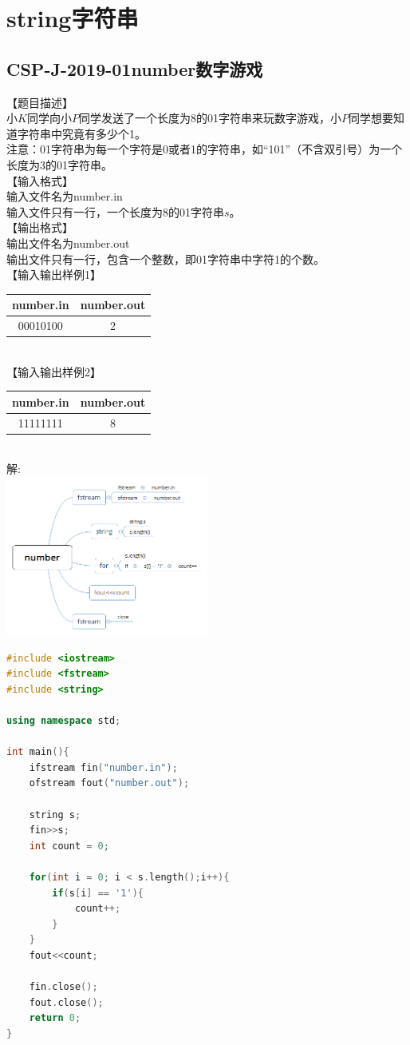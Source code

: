 \documentclass[12pt,twiside,a4paper]{ctexbook}
\numberwithin{chapter}{part}
\begin{document}
\chapter{string字符串}
\section{CSP-J-2019-01number数字游戏}
【题目描述】\\
小$K$同学向小$P$同学发送了一个长度为8的01字符串来玩数字游戏，小$P$同学想要知道字符串中究竟有多少个1。\\
注意：01字符串为每一个字符是0或者1的字符串，如“101”（不含双引号）为一个长度为3的01字符串。\\
【输入格式】\\
输入文件名为number.in\\
输入文件只有一行，一个长度为8的01字符串$s$。\\
【输出格式】\\
输出文件名为number.out\\
输出文件只有一行，包含一个整数，即01字符串中字符1的个数。\\
【输入输出样例1】\\
\begin{tabular}{|c|c|}
\hline
number.in & number.out\\
\hline
00010100 & 2\\
\hline
\end{tabular}\\
【输入输出样例2】\\
\begin{tabular}{|c|c|}
\hline
number.in & number.out\\
\hline
11111111 & 8\\
\hline
\end{tabular}\\
解:\\
\includegraphics[width=0.5\textwidth]{number.png}
\begin{lstlisting}[language=C++]
#include <iostream>
#include <fstream>
#include <string>

using namespace std;

int main(){
	ifstream fin("number.in");
	ofstream fout("number.out");

	string s;
	fin>>s;
	int count = 0;

	for(int i = 0; i < s.length();i++){
		if(s[i] == '1'){
			count++;
		}
	}
	fout<<count;

	fin.close();
	fout.close();
	return 0;
}
\end{lstlisting}
\end{document}
